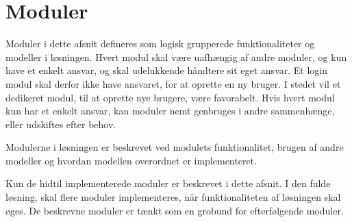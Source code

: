 \section{Moduler}
\label{sec:moduler}

Moduler i dette afsnit defineres som logisk grupperede funktionaliteter og modeller i løsningen. Hvert modul skal være uafhængig af andre moduler, og kun have et enkelt ansvar, og skal udelukkende håndtere sit eget ansvar. Et login modul skal derfor ikke have ansvaret, for at oprette en ny bruger. I stedet vil et dedikeret modul, til at oprette nye brugere, være favorabelt. Hvis hvert modul kun har et enkelt ansvar, kan moduler nemt genbruges i andre sammenhænge, eller udskiftes efter behov.

Modulerne i løsningen er beskrevet ved modulets funktionalitet, brugen af andre modeller og hvordan modellen overordnet er implementeret.

Kun de hidtil implementerede moduler er beskrevet i dette afsnit. I den fulde løsning, skal flere moduler implementeres, når funktionaliteten af løsningen skal øges. De beskrevne moduler er tænkt som en grobund for efterfølgende moduler.








